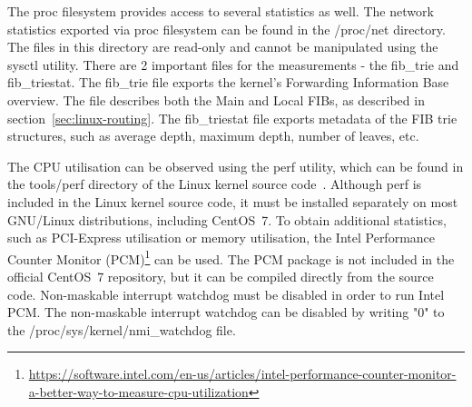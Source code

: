 The proc filesystem provides access to several statistics as well.
The network statistics exported via proc filesystem can be found in the /proc/net directory.
The files in this directory are read-only and cannot be manipulated using the sysctl utility.
There are 2 important files for the measurements - the fib\_trie and fib\_triestat.
The fib\_trie file exports the kernel's Forwarding Information Base overview.
The file describes both the Main and Local FIBs, as described in section~\ref{sec:linux-routing}.
The fib\_triestat file exports metadata of the FIB trie structures,
such as average depth, maximum depth, number of leaves, etc.

The CPU utilisation can be observed using the perf utility,
which can be found in the tools/perf directory of the Linux kernel source code~\cite{kernel-source}.
Although perf is included in the Linux kernel source code,
it must be installed separately on most GNU/Linux distributions, including CentOS~7.
To obtain additional statistics, such as PCI-Express utilisation or memory utilisation,
the Intel Performance Counter Monitor (PCM)\footnote{\url{https://software.intel.com/en-us/articles/intel-performance-counter-monitor-a-better-way-to-measure-cpu-utilization}}
can be used.
The PCM package is not included in the official CentOS~7 repository,
but it can be compiled directly from the source code.
Non-maskable interrupt watchdog must be disabled
in order to run Intel PCM.
The non-maskable interrupt watchdog can be disabled by writing "0" to the /proc/sys/kernel/nmi\_watchdog file.
